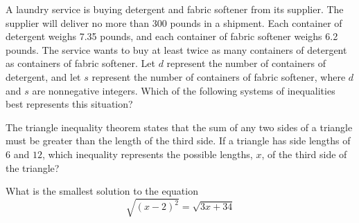 \noindent\markforreview

\vspace{1em}

A laundry service is buying detergent and fabric softener from its supplier. The supplier will deliver no more than 300 pounds in a shipment. Each container of detergent weighs 7.35 pounds, and each container of fabric softener weighs 6.2 pounds. The service wants to buy at least twice as many containers of detergent as containers of fabric softener. Let \( d \) represent the number of containers of detergent, and let \( s \) represent the number of containers of fabric softener, where \( d \) and \( s \) are nonnegative integers. Which of the following systems of inequalities best represents this situation?

\vspace{0.75em}


\newpage

\noindent\markforreview

\vspace{1em}

The triangle inequality theorem states that the sum of any two sides of a triangle must be greater than the length of the third side. If a triangle has side lengths of $6$ and $12$, which inequality represents the possible lengths, $x$, of the third side of the triangle?

\vspace{0.75em}

\newpage
\noindent\markforreview
\vspace{1em}

What is the smallest solution to the equation  
\[
\sqrt{(x - 2)^2} = \sqrt{3x + 34}
\]

\vspace{2em}


